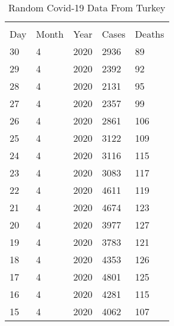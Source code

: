 \begin{table}[H]
\centering
\caption{Random Covid-19 Data From Turkey}
\begin{tabular}{l|l|l|l|l}
\multicolumn{5}{l}{} \\
Day & Month & Year & Cases & Deaths \\
\hline
30 & 4 & 2020 & 2936 & 89 \\
29 & 4 & 2020 & 2392 & 92 \\
28 & 4 & 2020 & 2131 & 95 \\
27 & 4 & 2020 & 2357 & 99 \\
26 & 4 & 2020 & 2861 & 106 \\
25 & 4 & 2020 & 3122 & 109 \\
24 & 4 & 2020 & 3116 & 115 \\
23 & 4 & 2020 & 3083 & 117 \\
22 & 4 & 2020 & 4611 & 119 \\
21 & 4 & 2020 & 4674 & 123 \\
20 & 4 & 2020 & 3977 & 127 \\
19 & 4 & 2020 & 3783 & 121 \\
18 & 4 & 2020 & 4353 & 126 \\
17 & 4 & 2020 & 4801 & 125 \\
16 & 4 & 2020 & 4281 & 115 \\
15 & 4 & 2020 & 4062 & 107
\end{tabular}
\end{table}
